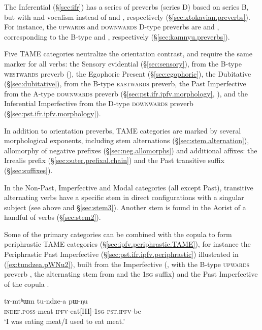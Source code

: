 The Inferential (§\ref{sec:ifr}) has a series of preverbs (series D) based on series B, but with  and  vocalism instead of  and , respectively (§\ref{sec:xtokavian.preverbs}). For instance, the  \textsc{upwards} and \textsc{downwards} D-type preverbs are  and , corresponding to the B-type  and , respectively (§\ref{sec:kamnyu.preverbs}).

Five TAME categories neutralize the orientation contrast, and require the same marker for all verbs: the Sensory evidential  (§\ref{sec:sensory}), from the B-type \textsc{westwards} preverb (), the Egophoric Present  (§\ref{sec:egophoric}), the Dubitative  (§\ref{sec:dubitative}), from the B-type \textsc{eastwards} preverb, the Past Imperfective  from the A-type \textsc{downwards} preverb (§\ref{sec:pst.ifr.ipfv.morphology}, \citealt{lin11direction}), and the Inferential Imperfective  from the D-type \textsc{downwards} preverb (§\ref{sec:pst.ifr.ipfv.morphology}).
 
In addition to orientation preverbs, TAME categories are marked by several morphological exponents, including stem alternations (§\ref{sec:stem.alternation}), allomorphy of negative prefixes (§\ref{sec:neg.allomorphs}) and additional affixes: the Irrealis  prefix (§\ref{sec:outer.prefixal.chain}) and the Past transitive  suffix (§\ref{sec:suffixes}).
 
In the Non-Past, Imperfective and Modal categories (all except Past), transitive alternating verbs have a specific stem in direct configurations with a singular subject (see  above and §\ref{sec:stem3}). Another stem is found in the Aorist of a handful of verbs (§\ref{sec:stem2}).
 
Some of the primary categories can be combined with the copula  to form periphrastic TAME categories (§\ref{sec:ipfv.periphrastic.TAME}), for instance the Periphrastic Past Imperfective (§\ref{sec:pst.ifr.ipfv.periphrastic}) illustrated in (\ref{ex:tundzea.pWNu2}), built from the Imperfective (, with the B-type \textsc{upwards} preverb , the alternating stem  from  and the \textsc{1sg} suffix) and the Past Imperfective of the copula .
 
 \begin{exe}
\ex \label{ex:tundzea.pWNu2}
\gll  tɤ-mtʰɯm tu-ndze-a pɯ-ŋu   \\
\textsc{indef}.\textsc{poss}-meat \textsc{ipfv}-eat[III]-\textsc{1sg} \textsc{pst}.\textsc{ipfv}-be \\
\glt `I was eating meat/I used to eat meat.' 
  \end{exe} 

